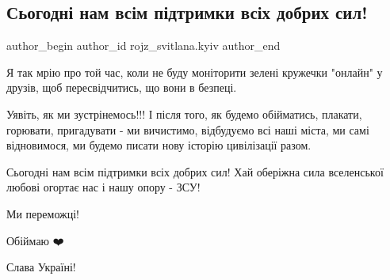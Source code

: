  
 
 
 
 
 
\subsection{Сьогодні нам всім підтримки всіх добрих сил!}
\label{sec:27_02_2022.fb.rojz_svitlana.kyiv.4.mria}
 
\ifcmt
 author_begin
   author_id rojz_svitlana.kyiv
 author_end
\fi

Я так мрію про той час, коли не буду моніторити зелені кружечки "онлайн" у
друзів, щоб пересвідчитись, що вони в безпеці. 

Уявіть, як ми зустрінемось!!! І після того, як будемо обійматись, плакати,
горювати, пригадувати - ми вичистимо, відбудуємо всі наші міста, ми самі
відновимося, ми будемо писати нову історію цивілізації  разом. 

Сьогодні нам всім підтримки всіх добрих сил! Хай оберіжна сила  вселенської
любові огортає нас і нашу опору - ЗСУ!

Ми переможці!

Обіймаю ❤️

Слава Україні!
